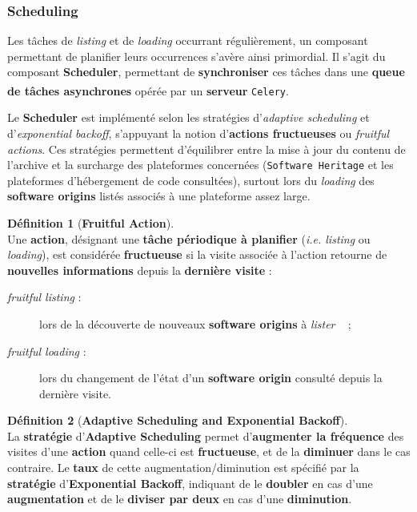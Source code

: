 \documentclass[12pt,a4paper]{report}
\theoremstyle{definition}
\newtheorem*{definition}{Définition}
\begin{document}
\subsubsection{Scheduling}
Les tâches de \textit{listing} et de \textit{loading} occurrant régulièrement, un composant permettant de planifier leurs occurrences s'avère ainsi primordial. Il s'agit du composant \textbf{Scheduler}, permettant de \textbf{synchroniser} ces tâches dans une \textbf{queue de tâches asynchrones} opérée par un \textbf{serveur} \texttt{Celery}\textsuperscript{\citep{dicosmoWhyAndHow}}.

Le \textbf{Scheduler} est implémenté selon les stratégies d'\textit{adaptive scheduling} et d'\textit{exponential backoff}, s'appuyant la notion d'\textbf{actions fructueuses} ou \textit{fruitful actions}. Ces stratégies permettent d'équilibrer entre la mise à jour du contenu de l'archive et la surcharge des plateformes concernées (\texttt{Software Heritage} et les plateformes d'hébergement de code consultées), surtout lors du \textit{loading} des \textbf{software origins} listés associés à une plateforme assez large.

\begin{definition}[\textbf{Fruitful Action}]\mbox{}\\
Une \textbf{action}, désignant une \textbf{tâche périodique à planifier} (\textit{i.e. listing} ou \textit{loading}), est considérée \textbf{fructueuse}	si la visite associée à l'action retourne de \textbf{nouvelles informations} depuis la \textbf{dernière visite} :
\begin{description}
	\item [\textit{fruitful listing} :] lors de la découverte de nouveaux \textbf{software origins} à \og \textit{lister} \fg~ ;
	\item [\textit{fruitful loading} :] lors du changement de l'état d'un \textbf{software origin} consulté depuis la dernière visite.
\end{description}
\end{definition}

\begin{definition}[\textbf{Adaptive Scheduling and Exponential Backoff}]\mbox{}\\
La \textbf{stratégie} d'\textbf{Adaptive Scheduling} permet d'\textbf{augmenter la fréquence} des visites d'une \textbf{action} quand celle-ci est \textbf{fructueuse}, et de la \textbf{diminuer} dans le cas contraire. Le \textbf{taux} de cette augmentation/diminution est spécifié par la \textbf{stratégie} d'\textbf{Exponential Backoff}, indiquant de le \textbf{doubler} en cas d'une \textbf{augmentation} et de le \textbf{diviser par deux} en cas d'une \textbf{diminution}.
\end{definition}
\end{document}
